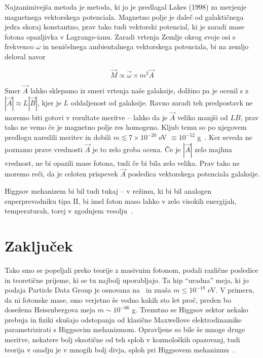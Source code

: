 \documentclass[a4paper, twocolumn, titlepage]{article}
\newcommand{\w}{
	\ensuremath{\omega}
}
\begin{document}
Najzanimivejša metoda je metoda, ki jo je predlagal
Lakes (1998) za merjenje magnetnega vektorskega potenciala. Magnetno polje je daleč od galaktičnega jedra
skoraj konstantno, prav tako tudi vektorski potencial, ki je zaradi mase fotona opazljivka v Lagrange-ianu. Zaradi vrtenja Zemlje okrog
svoje osi s frekvenco $\w$ in neničelnega ambientalnega vektorskega potenciala, bi na zemljo deloval navor

\[
	\vec{M} \propto \vec{\w} \times m^2\vec{A}
\]

Smer $\vec{A}$ lahko sklepamo iz smeri vrtenja naše galaksije, dolžino pa je ocenil s z $|\vec{A}| \approx L|\vec{B}|$, kjer je $L$ oddaljenost
od galaksije. Ravno zaradi teh predpostavk ne moremo biti gotovi v rezultate meritve -- lahko da je $\vec{A}$ veliko manjši od $LB$, prav
tako ne vemo če je magnetno polje res homogeno. Kljub temu so po njegovem predlogu naredili meritev in dobili
$m \lesssim 7 \times 10^{-20}$ eV $\equiv 10^{-52}$ g~\cite{nieto2}. Ker seveda ne poznamo prave vrednosti $\vec{A}$ je to zelo groba ocena.
Če je $|\vec{A}|$ zelo majhna vrednost, ne bi opazili mase fotona, tudi če bi bila zelo velika. Prav tako ne moremo reči, da je celoten
prispevek $\vec{A}$ posledica vektorskega potenciala galaksije.

Higgsov mehanizem bi bil tudi tukaj -- v režimu, ki bi bil analogen superprevodniku tipa II, bi imel foton maso lahko v zelo visokih energijah,
temperaturah, torej v zgodnjem vesolju~\cite{nieto2}.

\section{Zaključek}

Tako smo se popeljali preko teorije z masivnim fotonom, podali različne posledice in teoretične prijeme, ki se tu najbolj uporabljajo. Ta hip
"`uradna"' meja, ki jo podaja {\sc Particle Data Group} je osnovana na~\cite{nieto2} in znaša $m \leq 10^{-18}$ eV. V primeru, da ni fotonske
mase, smo verjetno še vedno kakih sto let proč, preden bo dosežena Heisenbergova meja $m \sim 10^{-66}$ g. Trenutno se Higgsov sektor nekako
prebuja in fiziki skušajo odstopanja od klasične Maxwellove elektrodinamike parametrizirati s Higgsovim mehanizmom. Opravljene so bile še
mnoge druge meritve, nekatere bolj eksotične od teh sploh v kozmoloških opazovanj, tudi teorija v ozadju je v mnogih bolj divja, sploh pri
Higgsovem mehanizmu~\cite{higgs}.
\end{document}
